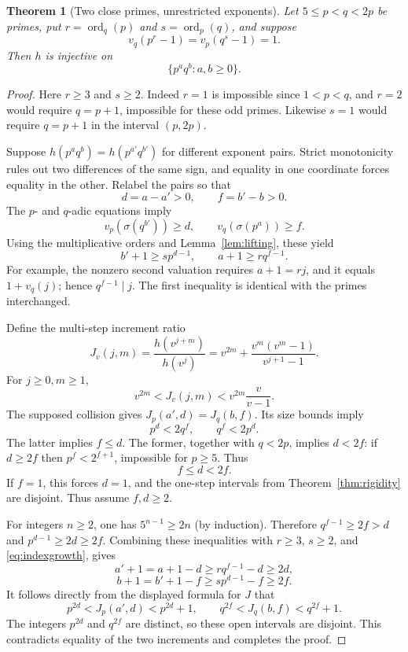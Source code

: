 \documentclass[11pt]{article}
\newtheorem{theorem}{Theorem}[section]
\DeclareMathOperator{\ord}{ord}
\begin{document}
\begin{theorem}[Two close primes, unrestricted exponents]\label{thm:allpowers}
Let $5\le p<q<2p$ be primes, put $r=\ord_q(p)$ and $s=\ord_p(q)$, and suppose
\[
 v_q(p^r-1)=v_p(q^s-1)=1.
\]
Then $h$ is injective on
\[
 \{p^a q^b:a,b\ge0\}.
\]
\end{theorem}
\begin{proof}
Here $r\ge3$ and $s\ge2$. Indeed $r=1$ is impossible since $1<p<q$, and $r=2$ would require $q=p+1$, impossible for these odd primes. Likewise $s=1$ would require $q=p+1$ in the interval $(p,2p)$.

Suppose $h(p^a q^b)=h(p^{a'}q^{b'})$ for different exponent pairs. Strict monotonicity rules out two differences of the same sign, and equality in one coordinate forces equality in the other. Relabel the pairs so that
\[
 d=a-a'>0,\qquad f=b'-b>0.
\]
The $p$- and $q$-adic equations imply
\[
 v_p(\sigma(q^{b'}))\ge d,
 \qquad v_q(\sigma(p^a))\ge f.
\]
Using the multiplicative orders and Lemma~\ref{lem:lifting}, these yield
\begin{equation}\label{eq:indexgrowth}
 b'+1\ge s p^{d-1},\qquad a+1\ge r q^{f-1}.
\end{equation}
For example, the nonzero second valuation requires $a+1=rj$, and it equals $1+v_q(j)$; hence $q^{f-1}\mid j$. The first inequality is identical with the primes interchanged.

Define the multi-step increment ratio
\[
 J_v(j,m)=\frac{h(v^{j+m})}{h(v^j)}
 =v^{2m}+\frac{v^m(v^m-1)}{v^{j+1}-1}.
\]
For $j\ge0,m\ge1$,
\[
 v^{2m}<J_v(j,m)<v^{2m}\frac v{v-1}.
\]
The supposed collision gives $J_p(a',d)=J_q(b,f)$. Its size bounds imply
\[
 p^d<2q^f,\qquad q^f<2p^d.
\]
The latter implies $f\le d$. The former, together with $q<2p$, implies $d<2f$: if $d\ge2f$ then $p^f<2^{f+1}$, impossible for $p\ge5$. Thus
\begin{equation}\label{eq:df}
 f\le d<2f.
\end{equation}
If $f=1$, this forces $d=1$, and the one-step intervals from Theorem~\ref{thm:rigidity} are disjoint. Thus assume $f,d\ge2$.

For integers $n\ge2$, one has $5^{n-1}\ge2n$ (by induction). Therefore $q^{f-1}\ge2f>d$ and $p^{d-1}\ge2d\ge2f$. Combining these inequalities with $r\ge3$, $s\ge2$, and \eqref{eq:indexgrowth}, gives
\[
 a'+1=a+1-d\ge r q^{f-1}-d\ge2d,
\]
\[
 b+1=b'+1-f\ge s p^{d-1}-f\ge2f.
\]
It follows directly from the displayed formula for $J$ that
\[
 p^{2d}<J_p(a',d)<p^{2d}+1,
 \qquad
 q^{2f}<J_q(b,f)<q^{2f}+1.
\]
The integers $p^{2d}$ and $q^{2f}$ are distinct, so these open intervals are disjoint. This contradicts equality of the two increments and completes the proof.
\end{proof}
\end{document}
